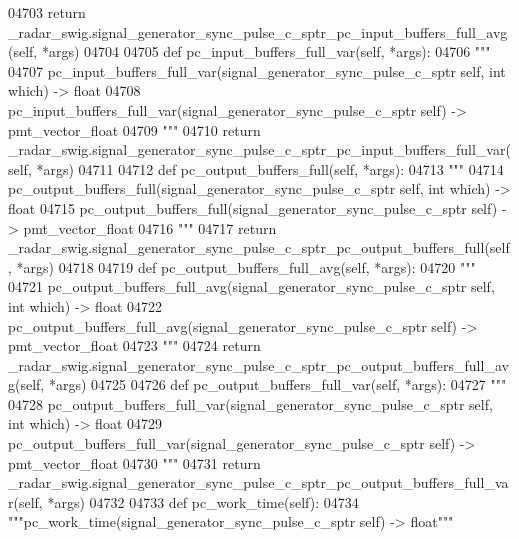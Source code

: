 \begin{DoxyCode}
{{{{{{{{{{{{{{{{04703         \textcolor{keywordflow}{return} \_radar\_swig.signal\_generator\_sync\_pulse\_c\_sptr\_pc\_input\_buffers\_full\_avg(self, *args)
04704 
04705     \textcolor{keyword}{def }pc_input_buffers_full_var(self, *args):
04706         \textcolor{stringliteral}{"""}
04707 \textcolor{stringliteral}{        pc\_input\_buffers\_full\_var(signal\_generator\_sync\_pulse\_c\_sptr self, int which) -> float}
04708 \textcolor{stringliteral}{        pc\_input\_buffers\_full\_var(signal\_generator\_sync\_pulse\_c\_sptr self) -> pmt\_vector\_float}
04709 \textcolor{stringliteral}{        """}
04710         \textcolor{keywordflow}{return} \_radar\_swig.signal\_generator\_sync\_pulse\_c\_sptr\_pc\_input\_buffers\_full\_var(self, *args)
04711 
04712     \textcolor{keyword}{def }pc_output_buffers_full(self, *args):
04713         \textcolor{stringliteral}{"""}
04714 \textcolor{stringliteral}{        pc\_output\_buffers\_full(signal\_generator\_sync\_pulse\_c\_sptr self, int which) -> float}
04715 \textcolor{stringliteral}{        pc\_output\_buffers\_full(signal\_generator\_sync\_pulse\_c\_sptr self) -> pmt\_vector\_float}
04716 \textcolor{stringliteral}{        """}
04717         \textcolor{keywordflow}{return} \_radar\_swig.signal\_generator\_sync\_pulse\_c\_sptr\_pc\_output\_buffers\_full(self, *args)
04718 
04719     \textcolor{keyword}{def }pc_output_buffers_full_avg(self, *args):
04720         \textcolor{stringliteral}{"""}
04721 \textcolor{stringliteral}{        pc\_output\_buffers\_full\_avg(signal\_generator\_sync\_pulse\_c\_sptr self, int which) -> float}
04722 \textcolor{stringliteral}{        pc\_output\_buffers\_full\_avg(signal\_generator\_sync\_pulse\_c\_sptr self) -> pmt\_vector\_float}
04723 \textcolor{stringliteral}{        """}
04724         \textcolor{keywordflow}{return} \_radar\_swig.signal\_generator\_sync\_pulse\_c\_sptr\_pc\_output\_buffers\_full\_avg(self, *args)
04725 
04726     \textcolor{keyword}{def }pc_output_buffers_full_var(self, *args):
04727         \textcolor{stringliteral}{"""}
04728 \textcolor{stringliteral}{        pc\_output\_buffers\_full\_var(signal\_generator\_sync\_pulse\_c\_sptr self, int which) -> float}
04729 \textcolor{stringliteral}{        pc\_output\_buffers\_full\_var(signal\_generator\_sync\_pulse\_c\_sptr self) -> pmt\_vector\_float}
04730 \textcolor{stringliteral}{        """}
04731         \textcolor{keywordflow}{return} \_radar\_swig.signal\_generator\_sync\_pulse\_c\_sptr\_pc\_output\_buffers\_full\_var(self, *args)
04732 
04733     \textcolor{keyword}{def }pc_work_time(self):
04734         \textcolor{stringliteral}{"""pc\_work\_time(signal\_generator\_sync\_pulse\_c\_sptr self) -> float"""}
}}}}}}}}}}}}}}}}
\end{DoxyCode}
